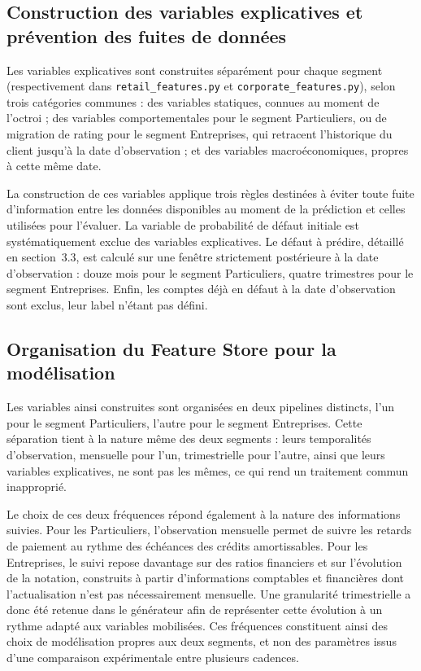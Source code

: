 \subsection{Construction des variables explicatives et prévention des fuites de données}

Les variables explicatives sont construites séparément pour chaque segment (respectivement dans \texttt{retail\_features.py} et \texttt{corporate\_features.py}), selon trois catégories communes : des variables statiques, connues au moment de l'octroi ; des variables comportementales pour le segment Particuliers, ou de migration de rating pour le segment Entreprises, qui retracent l'historique du client jusqu'à la date d'observation ; et des variables macroéconomiques, propres à cette même date.

La construction de ces variables applique trois règles destinées à éviter toute fuite d'information entre les données disponibles au moment de la prédiction et celles utilisées pour l'évaluer. La variable de probabilité de défaut initiale est systématiquement exclue des variables explicatives. Le défaut à prédire, détaillé en section~3.3, est calculé sur une fenêtre strictement postérieure à la date d'observation : douze mois pour le segment Particuliers, quatre trimestres pour le segment Entreprises. Enfin, les comptes déjà en défaut à la date d'observation sont exclus, leur label n'étant pas défini.

\subsection{Organisation du Feature Store pour la modélisation}

Les variables ainsi construites sont organisées en deux pipelines distincts, l'un pour le segment Particuliers, l'autre pour le segment Entreprises. Cette séparation tient à la nature même des deux segments : leurs temporalités d'observation, mensuelle pour l'un, trimestrielle pour l'autre, ainsi que leurs variables explicatives, ne sont pas les mêmes, ce qui rend un traitement commun inapproprié.

Le choix de ces deux fréquences répond également à la nature des informations suivies. Pour les Particuliers, l'observation mensuelle permet de suivre les retards de paiement au rythme des échéances des crédits amortissables. Pour les Entreprises, le suivi repose davantage sur des ratios financiers et sur l'évolution de la notation, construits à partir d'informations comptables et financières dont l'actualisation n'est pas nécessairement mensuelle. Une granularité trimestrielle a donc été retenue dans le générateur afin de représenter cette évolution à un rythme adapté aux variables mobilisées. Ces fréquences constituent ainsi des choix de modélisation propres aux deux segments, et non des paramètres issus d'une comparaison expérimentale entre plusieurs cadences.

